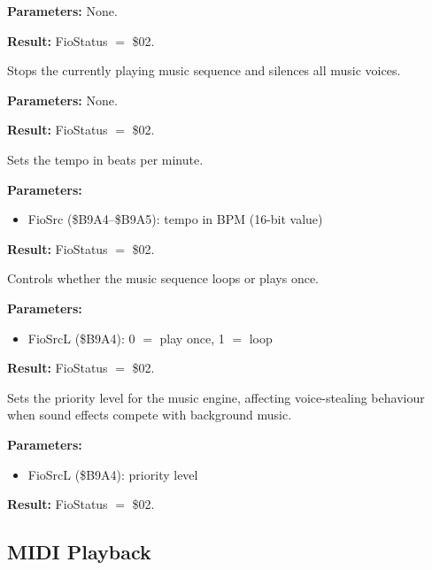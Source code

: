 \textbf{Parameters:} None.

\textbf{Result:} FioStatus $=$ \$02.

\medskip


Stops the currently playing music sequence and silences all music voices.

\textbf{Parameters:} None.

\textbf{Result:} FioStatus $=$ \$02.

\medskip


Sets the tempo in beats per minute.

\textbf{Parameters:}
\begin{itemize}
  \item FioSrc (\$B9A4--\$B9A5): tempo in BPM (16-bit value)
\end{itemize}

\textbf{Result:} FioStatus $=$ \$02.

\medskip


Controls whether the music sequence loops or plays once.

\textbf{Parameters:}
\begin{itemize}
  \item FioSrcL (\$B9A4): 0 $=$ play once, 1 $=$ loop
\end{itemize}

\textbf{Result:} FioStatus $=$ \$02.

\medskip


Sets the priority level for the music engine, affecting voice-stealing
behaviour when sound effects compete with background music.

\textbf{Parameters:}
\begin{itemize}
  \item FioSrcL (\$B9A4): priority level
\end{itemize}

\textbf{Result:} FioStatus $=$ \$02.


\subsection{MIDI Playback}

